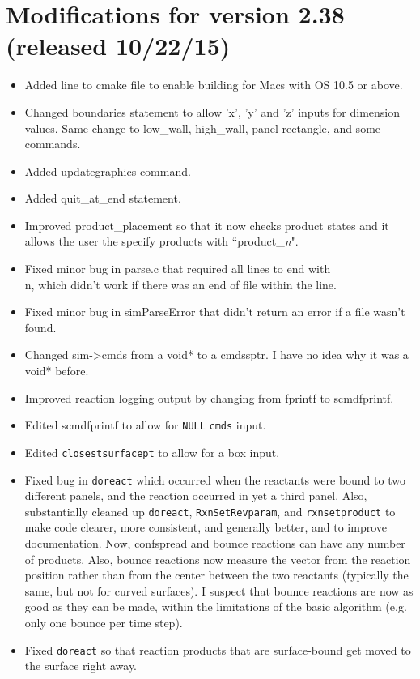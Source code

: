 \documentclass {scrbook}
\newcommand {\ttt} {\texttt}
\begin{document}
\section{Modifications for version 2.38 (released 10/22/15)}
\begin{itemize}
\item Added line to cmake file to enable building for Macs with OS 10.5 or above.
\item Changed boundaries statement to allow 'x', 'y' and 'z' inputs for dimension values. Same change to low\_wall, high\_wall, panel rectangle, and some commands.
\item Added updategraphics command.
\item Added quit\_at\_end statement.
\item Improved product\_placement so that it now checks product states and it allows the user the specify products with ``product\_\textit{n}".
\item Fixed minor bug in parse.c that required all lines to end with \\n, which didn't work if there was an end of file within the line.
\item Fixed minor bug in simParseError that didn't return an error if a file wasn't found.
\item Changed sim->cmds from a void* to a cmdssptr. I have no idea why it was a void* before.
\item Improved reaction logging output by changing from fprintf to scmdfprintf.
\item Edited scmdfprintf to allow for \ttt{NULL} \ttt{cmds} input.
\item Edited \ttt{closestsurfacept} to allow for a box input.
\item Fixed bug in \ttt{doreact} which occurred when the reactants were bound to two different panels, and the reaction occurred in yet a third panel. Also, substantially cleaned up \ttt{doreact}, \ttt{RxnSetRevparam}, and \ttt{rxnsetproduct} to make code clearer, more consistent, and generally better, and to improve documentation. Now, confspread and bounce reactions can have any number of products. Also, bounce reactions now measure the vector from the reaction position rather than from the center between the two reactants (typically the same, but not for curved surfaces). I suspect that bounce reactions are now as good as they can be made, within the limitations of the basic algorithm (e.g. only one bounce per time step).
\item Fixed \ttt{doreact} so that reaction products that are surface-bound get moved to the surface right away.

\end{itemize}
\end{document}
